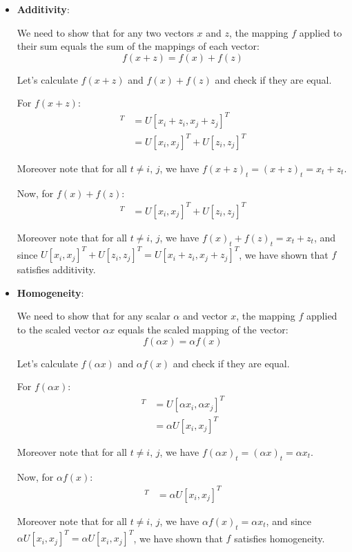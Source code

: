 \documentclass{article}
\begin{document}
\begin{enumerate}[leftmargin=\labelsep]
\begin{itemize}
\item \textbf{Additivity}:

We need to show that for any two vectors $x$ and $z$, the mapping $f$ applied to their sum equals the sum of the mappings of each vector:
\[
f(x + z) = f(x) + f(z)
\]

Let's calculate $f(x + z)$ and $f(x) + f(z)$ and check if they are equal.

For $f(x + z)$:
\begin{align}
[y_i, y_j]^T &= U[x_i + z_{i}, x_j + z_{j}]^T \\
&= U[x_i, x_j]^T + U[z_{i}, z_{j}]^T
\end{align}

Moreover note that for all $t \neq i,\,j$, we have $f(x+z)_t = (x + z)_t = x_t + z_t$.

Now, for $f(x) + f(z)$:
\begin{align}
[y_i, y_j]^T &= U[x_i, x_j]^T + U[z_{i}, z_{j}]^T
\end{align}

Moreover note that for all $t \neq i,\,j$, we have $f(x)_t+f(z)_t = x_t + z_t$, and since $U[x_i, x_j]^T + U[z_{i}, z_{j}]^T = U[x_i + z_{i}, x_j + z_{j}]^T$, we have shown that $f$ satisfies additivity.

\item \textbf{Homogeneity}:

We need to show that for any scalar $\alpha$ and vector $x$, the mapping $f$ applied to the scaled vector $\alpha x$ equals the scaled mapping of the vector:
\[
f(\alpha x) = \alpha f(x)
\]

Let's calculate $f(\alpha x)$ and $\alpha f(x)$ and check if they are equal.

For $f(\alpha x)$:
\begin{align*}
[y_i, y_j]^T &= U[\alpha x_i, \alpha x_j]^T \\
&= \alpha U[x_i, x_j]^T
\end{align*}

Moreover note that for all $t \neq i,\,j$, we have $f(\alpha x)_t = (\alpha x)_t =\alpha x_t$.

Now, for $\alpha f(x)$:
\begin{align*}
[y_i, y_j]^T &= \alpha U[x_i, x_j]^T
\end{align*}

Moreover note that for all $t \neq i,\,j$, we have $\alpha f(x)_t =\alpha x_t$, and since $\alpha U[x_i, x_j]^T = \alpha U[x_i, x_j]^T$, we have shown that $f$ satisfies homogeneity.


\end{itemize}
\end{enumerate}
\end{document}
